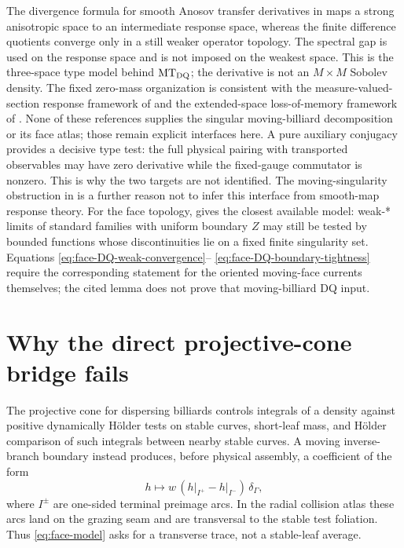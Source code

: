 \documentclass[11pt]{article}
\begin{document}
The divergence formula for smooth Anosov transfer derivatives in
\cite{FroylandPhalempin} maps a strong anisotropic space to an intermediate
response space, whereas the finite difference quotients converge only in a
still weaker operator topology.  The spectral gap is used on the response
space and is not imposed on the weakest space.  This is the three-space type
model behind $\mathrm{MT}_{\rm DQ}$; the derivative is not an $M\times M$
Sobolev density.  The fixed zero-mass organization is
consistent with the measure-valued-section response framework of
\cite{AlvesBahsoun} and the extended-space loss-of-memory framework of
\cite{GalatoloLucarini}.  None of these references supplies the singular
moving-billiard decomposition or its face atlas; those remain explicit
interfaces here.  A pure auxiliary conjugacy provides a decisive type test:
the full physical pairing with transported observables may have zero
derivative while the fixed-gauge commutator is nonzero.  This is why the two
targets are not identified.
The moving-singularity obstruction in \cite{BahsounGalatolo} is a further
reason not to infer this interface from smooth-map response theory.
For the face topology, \cite[Lemma~5.4]{CanestrariHoles} gives the closest
available model: weak-* limits of standard families with uniform boundary
$Z$ may still be tested by bounded functions whose discontinuities lie on a
fixed finite singularity set.  Equations
\eqref{eq:face-DQ-weak-convergence}--
\eqref{eq:face-DQ-boundary-tightness} require the corresponding statement for
the oriented moving-face currents themselves; the cited lemma does not prove
that moving-billiard DQ input.

\section{Why the direct projective-cone bridge fails}

The projective cone for dispersing billiards controls integrals of a density
against positive dynamically H\"older tests on stable curves, short-leaf
mass, and H\"older comparison of such integrals between nearby stable curves.
A moving inverse-branch boundary instead produces, before physical assembly,
a coefficient of the form
\begin{equation}
\label{eq:face-model}
  h\longmapsto w\,(h\vert_{I^+}-h\vert_{I^-})\,\delta_\Gamma,
\end{equation}
where $I^\pm$ are one-sided terminal preimage arcs.  In the radial collision
atlas these arcs land on the grazing seam and are transversal to the stable
test foliation.  Thus \eqref{eq:face-model} asks for a transverse trace, not a
stable-leaf average.
\end{document}

